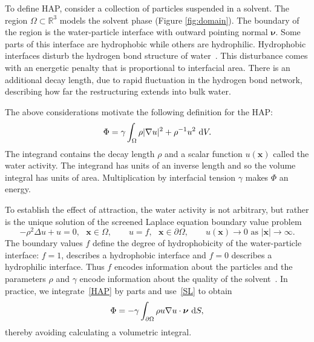 To define HAP, consider a collection of particles suspended in a
solvent. The region $\Omega \subset \mathbb{R}^3$ models the solvent
phase (Figure \ref{fig:domain}).
The boundary of the region is the water-particle interface with outward
pointing normal $\boldsymbol{\nu}$. Some parts of this interface are
hydrophobic while others are hydrophilic. Hydrophobic interfaces disturb
the hydrogen bond structure of water~\cite{Luzar1987, Jonsson2006,
Varilly2011}. This disturbance comes with an energetic penalty that is
proportional to interfacial area. There is an additional decay length,
due to rapid fluctuation in the hydrogen bond network, describing how
far the restructuring extends into bulk water.

The above considerations motivate the following definition for the HAP:
\begin{align}
\label{HAP}
  \Phi = \gamma \int_{\Omega} \rho |\nabla u|^2 + \rho^{-1}u^2 \,\dif V. 
\end{align}
The integrand contains
the decay length $\rho$
and a scalar function $u(\mathbf{x})$ called the water activity.
The integrand has units of an inverse length and so
the volume integral has units of area. Multiplication by interfacial tension
$\gamma$ makes $\Phi$ an energy. 

To establish the effect of attraction, the water activity is not
arbitrary, but rather is the unique solution of the screened Laplace
equation boundary value problem 
\begin{equation}
  \label{SL}
  -\rho^2 \Delta u + u = 0, \mbox{ } \mathbf{x} \in \Omega, \qquad
  u = f,  \mbox{ } \mathbf{x} \in \partial \Omega, \qquad 
  u(\mathbf{x}) \to 0 \mbox{ as } |\mathbf{x}| \to \infty.
\end{equation}
The boundary values $f$ define the degree of hydrophobicity of the
water-particle interface: $f=1$, describes a hydrophobic interface and
$f=0$ describes a hydrophilic interface. Thus $f$ encodes information
about the particles and the parameters $\rho$ and $\gamma$ encode
information about the quality of the solvent~\cite{Israelachvili1954,
Discher2002}. In practice, we integrate~\eqref{HAP} by parts and
use~\eqref{SL} to obtain
\begin{equation}
\label{eq:HAP_easy}
\Phi = -\gamma \int_{\partial \Omega} \rho u \nabla u \cdot \boldsymbol{\nu} \,\dif S,
\end{equation}
thereby avoiding calculating a volumetric integral.


